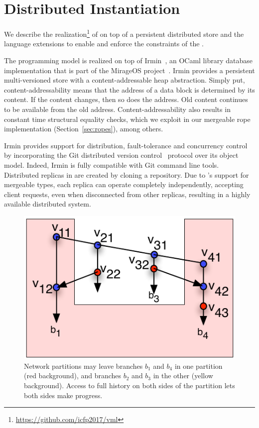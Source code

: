 \section{Distributed Instantiation}
\label{sec:implementation}

We describe the
realization\footnote{\url{https://github.com/icfp2017/vml}} of \name on top of a persistent
distributed store and the language extensions to enable and enforce
the constraints of the \name.

The \name programming model is realized on top of Irmin~\cite{irmin},
an OCaml library database implementation that is part of the MirageOS
project~\cite{mirage}. Irmin provides a persistent multi-versioned
store with a content-addressable heap abstraction. Simply put,
content-addressability means that the address of a data block is
determined by its content. If the content changes, then so does the
address. Old content continues to be available from the old
address. Content-addressability also results in constant time
structural equality checks, which we exploit in our mergeable rope
implementation (Section~\ref{sec:ropes}), among others.

Irmin provides support for distribution, fault-tolerance and
concurrency control by incorporating the Git distributed version
control~\cite{git} protocol over its object model. Indeed, Irmin is
fully compatible with Git command line tools. Distributed replicas in
\name are created by cloning a \name repository. Due to \name's
support for mergeable types, each replica can operate completely
independently, accepting client requests, even when disconnected from
other replicas, resulting in a highly available distributed system.

\begin{figure}
	\begin{center}
	\includegraphics[scale=0.8]{Figures/partitions}
	\end{center}
  \caption{Network partitions may leave branches $b_1$ and $b_4$ in
  one partition (red background), and branches $b_2$ and $b_3$ in the
  other (yellow background). Access to full history on both sides of
  the partition lets both sides make progress.}
	\label{fig:partitions}
\end{figure}

